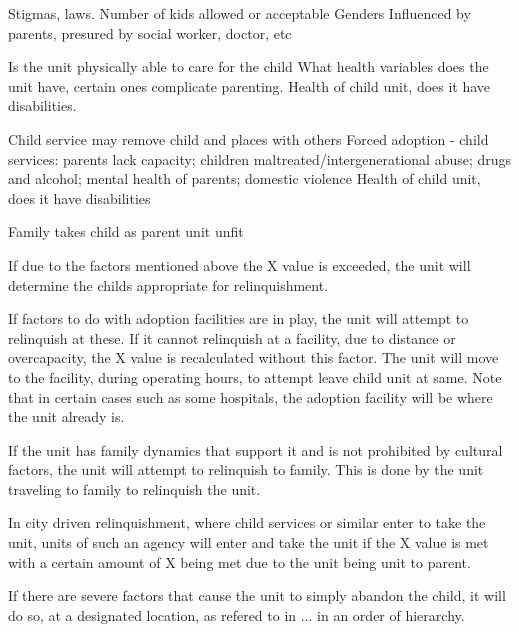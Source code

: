 Stigmas, laws.
Number of kids allowed or acceptable
Genders
Influenced by parents, presured by social worker, doctor, etc

Is the unit physically able to care for the child
What health variables does the unit have, certain ones complicate parenting.
Health of child unit, does it have disabilities. 


Child service may remove child and places with others
Forced adoption - child services: parents lack capacity; children maltreated/intergenerational abuse; drugs and alcohol; mental health of parents; domestic violence
Health of child unit, does it have disabilities

Family takes child as parent unit unfit


 
If due to the factors mentioned above the X value is exceeded, the unit will determine the childs appropriate for relinquishment. 

If factors to do with adoption facilities are in play, the unit will attempt to relinquish at these. If it cannot relinquish at a facility, due to distance or overcapacity, the X value is recalculated without this factor. The unit will move to the facility, during operating hours, to attempt leave child unit at same. Note that in certain cases such as some hospitals, the adoption facility will be where the unit already is.

If the unit has family dynamics that support it and is not prohibited by cultural factors, the unit will attempt to relinquish to family. This is done by the unit traveling to family to relinquish the unit.

In city driven relinquishment, where child services or similar enter to take the unit, units of such an agency will enter and take the unit if the X value is met with a certain amount of X being met due to the unit being unit to parent.

If there are severe factors that cause the unit to simply abandon the child, it will do so, at a designated location, as refered to in ... in an order of hierarchy.

